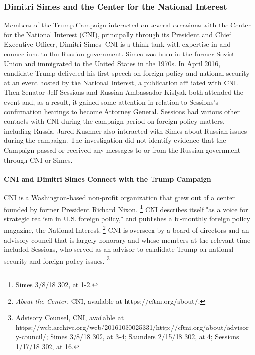 \subsubsection{Dimitri Simes and the Center for the National Interest}

Members of the Trump Campaign interacted on several occasions with the Center for the National Interest (CNI), principally through its President and Chief Executive Officer, Dimitri Simes.
CNI is a think tank with expertise in and connections to the Russian government.
Simes was born in the former Soviet Union and immigrated to the United States in the 1970s.
In April 2016, candidate Trump delivered his first speech on foreign policy and national security at an event hosted by the National Interest, a publication affiliated with CNI.
Then-Senator Jeff Sessions and Russian Ambassador Kislyak both attended the event and, as a result, it gained some attention in relation to Sessions's confirmation hearings to become Attorney General.
Sessions had various other contacts with CNI during the campaign period on foreign-policy matters, including Russia.
Jared Kushner also interacted with Simes about Russian issues during the campaign.
The investigation did not identify evidence that the Campaign passed or received any messages to or from the Russian government through CNI or Simes.

\paragraph{CNI and Dimitri Simes Connect with the Trump Campaign}

CNI is a Washington-based non-profit organization that grew out of a center founded by former President Richard Nixon.%
\footnote{Simes 3/8/18 302, at 1-2.}
CNI describes itself "as a voice for strategic realism in U.S. foreign policy," and publishes a bi-monthly foreign policy magazine, the National Interest.%
\footnote{\textit{About the Center}, CNI, available at https://cftni.org/about/.}
CNI is overseen by a board of directors and an advisory council that is largely honorary and whose members at the relevant time included Sessions, who served as an advisor to candidate Trump on national security and foreign policy issues.%
\footnote{Advisory Counsel, CNI, available at 
https://web.archive.org/web/20161030025331/http://cftni.org/about/advisory-council/; 
Simes 3/8/18 302, at 3-4; 
Saunders 2/15/18 302, at 4; 
Sessions 1/17/18 302, at 16.}


